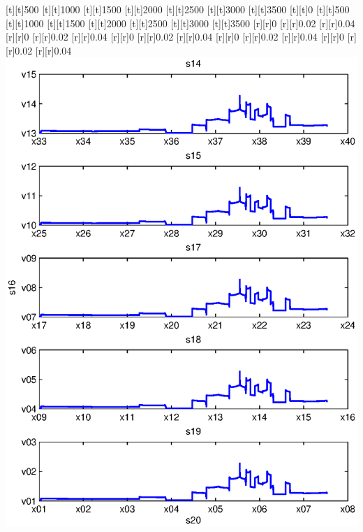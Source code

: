 \begin{psfrags}
[t][t]{500}%
[t][t]{1000}%
[t][t]{1500}%
[t][t]{2000}%
[t][t]{2500}%
[t][t]{3000}%
[t][t]{3500}%
[t][t]{0}%
[t][t]{500}%
[t][t]{1000}%
[t][t]{1500}%
[t][t]{2000}%
[t][t]{2500}%
[t][t]{3000}%
[t][t]{3500}%
%
[r][r]{0}%
[r][r]{0.02}%
[r][r]{0.04}%
[r][r]{0}%
[r][r]{0.02}%
[r][r]{0.04}%
[r][r]{0}%
[r][r]{0.02}%
[r][r]{0.04}%
[r][r]{0}%
[r][r]{0.02}%
[r][r]{0.04}%
[r][r]{0}%
[r][r]{0.02}%
[r][r]{0.04}%
%
\includegraphics[width=15cm]{rmse_30_64.eps}%
\end{psfrags}%
%

